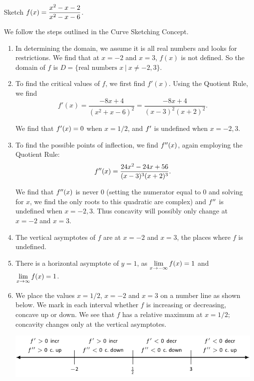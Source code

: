 \begin{example} \label{Ex:3.2.Eg5}
Sketch $\displaystyle f(x) = \frac{x^2-x-2}{x^2-x-6}$.

\solution We follow the steps outlined in the Curve Sketching Concept.

\begin{enumerate}[1)]
\item In determining the domain, we assume it is all real numbers and looks for restrictions. We find that at $x=-2$ and $x=3$, $f(x)$ is not defined. So the domain of $f$ is $D = \{\text{real numbers } x\ | \ x\neq -2,3\}$.

\item To find the critical values of $f$, we first find $f'(x)$. Using the Quotient Rule, we find 
$$f'(x) = \frac{-8x+4}{(x^2+x-6)^2} = \frac{-8x+4}{(x-3)^2(x+2)^2}.$$
		
We find that $f'(x) = 0$ when $x = 1/2$, and $f'$ is undefined when $x=-2,3$. 
		
\item To find the possible points of inflection, we find $f''(x)$, again employing the Quotient Rule: 
$$f''(x) = \frac{24x^2-24x+56}{(x-3)^3(x+2)^3}.$$
		
We find that $f''(x)$ is never $0$ (setting the numerator equal to $0$ and solving for $x$, we find the only roots to this quadratic are complex) and $f''$ is undefined when $x=-2,3$. Thus concavity will possibly only change at $x=-2$ and $x=3$.
		
\item The vertical asymptotes of $f$ are at $x=-2$ and $x=3$, the places where $f$ is undefined.
		
\item There is a horizontal asymptote of $y=1$, as $\displaystyle \lim_{x\to -\infty}f(x) = 1$ and $\displaystyle\lim_{x\to\infty}f(x) =1$.
		
\item We place the values $x=1/2$, $x=-2$ and $x=3$ on a number line as shown below. We mark in each interval whether $f$ is increasing or decreasing, concave up or down. We see that $f$ has a relative maximum at $x=1/2$; concavity changes only at the vertical asymptotes.

\begin{center}
\includegraphics[scale=.75]{figures/figsketchline2}
\end{center}


\end{enumerate}
\end{example}
